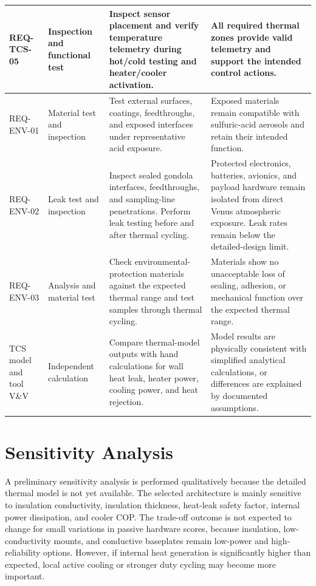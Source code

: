 \begin{longtable}{|p{2.4cm}|p{2.8cm}|p{5.0cm}|p{5.0cm}|}
REQ-TCS-05 &
Inspection and functional test &
Inspect sensor placement and verify temperature telemetry during hot/cold testing and heater/cooler activation. &
All required thermal zones provide valid telemetry and support the intended control actions. \\
\hline

REQ-ENV-01 &
Material test and inspection &
Test external surfaces, coatings, feedthroughs, and exposed interfaces under representative acid exposure. &
Exposed materials remain compatible with sulfuric-acid aerosols and retain their intended function. \\
\hline

REQ-ENV-02 &
Leak test and inspection &
Inspect sealed gondola interfaces, feedthroughs, and sampling-line penetrations. Perform leak testing before and after thermal cycling. &
Protected electronics, batteries, avionics, and payload hardware remain isolated from direct Venus atmospheric exposure. Leak rates remain below the detailed-design limit. \\
\hline

REQ-ENV-03 &
Analysis and material test &
Check environmental-protection materials against the expected thermal range and test samples through thermal cycling. &
Materials show no unacceptable loss of sealing, adhesion, or mechanical function over the expected thermal range. \\
\hline

TCS model and tool V\&V &
Independent calculation &
Compare thermal-model outputs with hand calculations for wall heat leak, heater power, cooling power, and heat rejection. &
Model results are physically consistent with simplified analytical calculations, or differences are explained by documented assumptions. \\
\hline

\end{longtable}

\normalsize
\section{Sensitivity Analysis}
\label{sec:tcs_sensitivity}

A preliminary sensitivity analysis is performed qualitatively because the detailed thermal model is not yet available. The selected architecture is mainly sensitive to insulation conductivity, insulation thickness, heat-leak safety factor, internal power dissipation, and cooler COP. The trade-off outcome is not expected to change for small variations in passive hardware scores, because insulation, low-conductivity mounts, and conductive baseplates remain low-power and high-reliability options. However, if internal heat generation is significantly higher than expected, local active cooling or stronger duty cycling may become more important.

